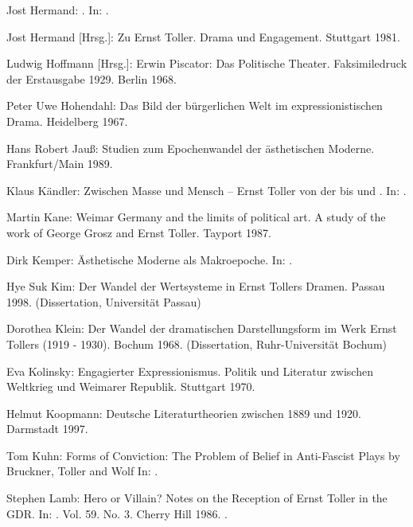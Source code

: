 \begin{BibList}{}
  Jost Hermand:
  \Cite{Hoppla, wir leben!}.
  In: .

  Jost Hermand [Hrsg.]:
  Zu Ernst Toller. Drama und Engagement. 
  Stuttgart 1981.

  Ludwig Hoffmann [Hrsg.]:
  Erwin Piscator: Das Politische Theater. Faksimiledruck der Erstausgabe 1929.
  Berlin 1968.

  Peter Uwe Hohendahl:
  Das Bild der bürgerlichen Welt im expressionistischen Drama.
  Heidelberg 1967.

  Hans Robert Jauß:
  Studien zum Epochenwandel der ästhetischen Moderne.
  Frankfurt/Main 1989.

  Klaus Kändler:
  Zwischen Masse und Mensch -- Ernst Toller von der \Cite{Wandlung} bis
  \Cite{Hoppla, wir leben!} und \Cite{Feuer aus den Kesseln!}.
  In: .

  Martin Kane:
  Weimar Germany and the limits of political art. A study of the
  work of George Grosz and Ernst Toller. 
  Tayport 1987.

  Dirk Kemper:
  Ästhetische Moderne als Makroepoche.
  In: .

  Hye Suk Kim:
  Der Wandel der Wertsysteme in Ernst Tollers Dramen.
  Passau 1998. (Dissertation, Universität Passau)

  Dorothea Klein:
  Der Wandel der dramatischen Darstellungsform im Werk Ernst Tollers (1919 -
  1930).
  Bochum 1968. (Dissertation, Ruhr-Universität Bochum)

  Eva Kolinsky:
  Engagierter Expressionismus. Politik und Literatur zwischen Weltkrieg und
  Weimarer Republik.
  Stuttgart 1970.

  Helmut Koopmann:
  Deutsche Literaturtheorien zwischen 1889 und 1920.
  Darmstadt 1997.

  Tom Kuhn:
  Forms of Conviction: The Problem of Belief in Anti-Fascist Plays by
  Bruckner, Toller and Wolf
  In: .

  Stephen Lamb:
  Hero or Villain? Notes on the Reception of Ernst Toller in the GDR. 
  In: . Vol. 59. No. 3. 
  Cherry Hill 1986. .


\end{BibList}
